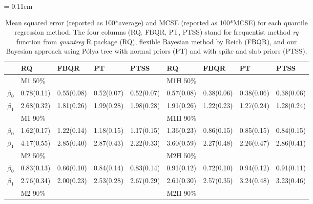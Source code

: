 \documentclass[12pt]{article}
\newcommand{\polya}{P\'{o}lya}
\begin{document}
\begin{center}
  \begin{table}[h]
    \centering
    \caption[]{ Mean squared error (reported as 100*average) and MCSE
      (reported as 100*MCSE) for each
      quantile regression method.   The four
      columns (RQ, FBQR,
      PT, PTSS) stand for frequentist method \textit{rq} function from
      \textit{quantreg} R package (RQ), flexible Bayesian method by Reich (FBQR), and
      our Bayesian approach using \polya{} tree with normal priors (PT) and with
      spike and slab priors (PTSS).}
    \vspace{4mm}
    \tabcolsep = 0.11cm
    \begin{tabular}[tb]{cllllllll}
      \hline
                & RQ          & FBQR        & PT          & PTSS        & RQ          & FBQR        & PT          & PTSS        \\
      \hline
                & M1 50\%     &             &             &             & M1H 50\%    &             &             &             \\
      $\beta_0$ & 0.78(0.11)  & 0.55(0.08)  & 0.52(0.07)  & 0.52(0.07)  & 0.57(0.08)  & 0.38(0.06)  & 0.38(0.06)  & 0.38(0.06)  \\
      $\beta_1$ & 2.68(0.32)  & 1.81(0.26)  & 1.99(0.28)  & 1.98(0.28)  & 1.91(0.26)  & 1.22(0.23)  & 1.27(0.24)  & 1.28(0.24)  \\
                & M1 90\%     &             &             &             & M1H 90\%    &             &             &             \\
      $\beta_0$ & 1.62(0.17)  & 1.22(0.14)  & 1.18(0.15)  & 1.17(0.15)  & 1.36(0.23)  & 0.86(0.15)  & 0.85(0.15)  & 0.84(0.15)  \\
      $\beta_1$ & 4.17(0.55)  & 2.85(0.40)  & 2.87(0.43)  & 2.22(0.33)  & 3.60(0.59)  & 2.27(0.48)  & 2.26(0.47)  & 2.86(0.41)  \\
      \hline
                & M2 50\%     &             &             &             & M2H 50\%    &             &             &             \\
      $\beta_0$ & 0.83(0.13)  & 0.66(0.10)  & 0.84(0.14)  & 0.83(0.14)  & 0.91(0.12)  & 0.72(0.10)  & 0.94(0.12)  & 0.91(0.11)  \\
      $\beta_1$ & 2.76(0.34)  & 2.00(0.23)  & 2.53(0.28)  & 2.67(0.29)  & 2.61(0.30)  & 2.57(0.35)  & 3.24(0.48)  & 3.23(0.46)  \\
                & M2 90\%     &             &             &             & M2H 90\%    &             &             &             \\

\end{tabular}
\end{table}
\end{center}
\end{document}
